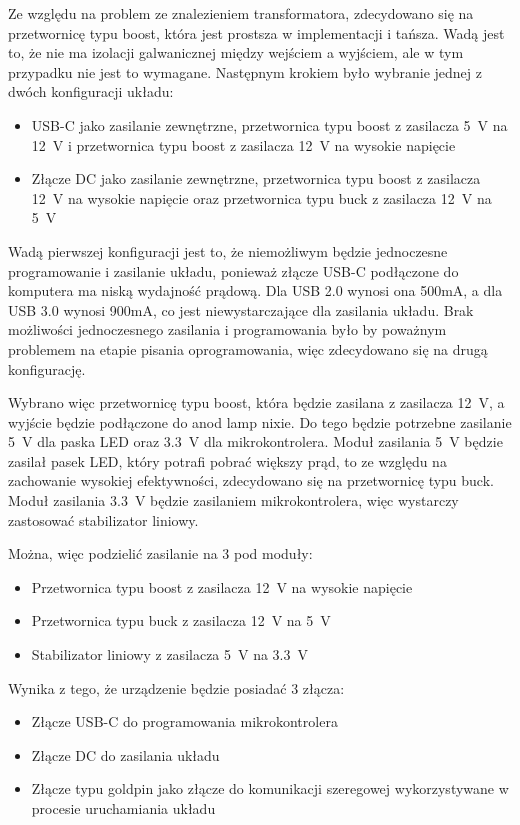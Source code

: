 \documentclass[../main.tex]{subfiles}
\begin{document}
Ze względu na problem ze znalezieniem transformatora, zdecydowano się na przetwornicę typu boost, która jest prostsza w implementacji i tańsza. 
Wadą jest to, że nie ma izolacji galwanicznej między wejściem a wyjściem, ale w tym przypadku nie jest to wymagane.
Następnym krokiem było wybranie jednej z dwóch konfiguracji układu:

\begin{itemize}
    \item USB-C jako zasilanie zewnętrzne, przetwornica typu boost z zasilacza \SI{5}{\volt} na \SI{12}{\volt} i przetwornica typu boost z zasilacza \SI{12}{\volt} na wysokie napięcie
    \item Złącze DC jako zasilanie zewnętrzne, przetwornica typu boost z zasilacza \SI{12}{\volt} na wysokie napięcie oraz przetwornica typu buck z zasilacza \SI{12}{\volt} na \SI{5}{\volt}
\end{itemize}

Wadą pierwszej konfiguracji jest to, że niemożliwym będzie jednoczesne programowanie i zasilanie układu, ponieważ złącze USB-C podłączone do komputera ma niską wydajność prądową.
Dla USB 2.0 wynosi ona 500mA, a dla USB 3.0 wynosi 900mA, co jest niewystarczające dla zasilania układu. Brak możliwości jednoczesnego zasilania i programowania było by 
poważnym problemem na etapie pisania oprogramowania, więc zdecydowano się na drugą konfigurację.

Wybrano więc przetwornicę typu boost, która będzie zasilana z zasilacza \SI{12}{\volt}, a wyjście będzie podłączone do anod lamp nixie.
Do tego będzie potrzebne zasilanie \SI{5}{\volt} dla paska LED oraz \SI{3.3}{\volt} dla mikrokontrolera. Moduł zasilania \SI{5}{\volt} będzie zasilał pasek LED, który potrafi pobrać większy prąd,
to ze względu na zachowanie wysokiej efektywności, zdecydowano się na przetwornicę typu buck. Moduł zasilania \SI{3.3}{\volt} będzie zasilaniem mikrokontrolera, więc wystarczy zastosować
stabilizator liniowy.

Można, więc podzielić zasilanie na 3 pod moduły:
\begin{itemize}
    \item Przetwornica typu boost z zasilacza \SI{12}{\volt} na wysokie napięcie
    \item Przetwornica typu buck z zasilacza \SI{12}{\volt} na \SI{5}{\volt}
    \item Stabilizator liniowy z zasilacza \SI{5}{\volt} na \SI{3.3}{\volt}
\end{itemize}

Wynika z tego, że urządzenie będzie posiadać 3 złącza:
\begin{itemize}
    \item Złącze USB-C do programowania mikrokontrolera
    \item Złącze DC do zasilania układu
    \item Złącze typu goldpin jako złącze do komunikacji szeregowej wykorzystywane w procesie uruchamiania układu
\end{itemize}
\end{document}
